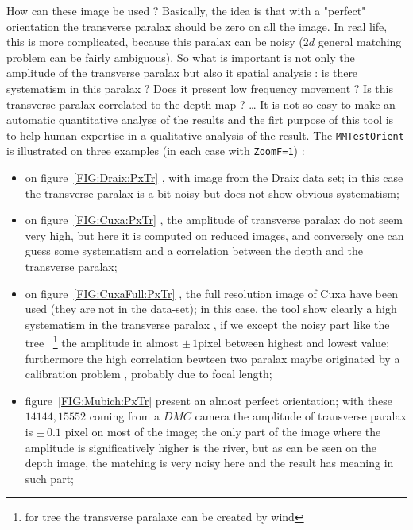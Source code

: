How can these image be used ? Basically, the idea is that with a "perfect" orientation the 
transverse paralax should be zero on all the image. In real life, this is more complicated, because this
paralax can be noisy ($2d$ general matching problem can be fairly ambiguous). So what is important is not
only the amplitude of the transverse paralax but also it spatial analysis : is there systematism in
this paralax ? Does it present low frequency movement ? Is this transverse paralax correlated to the
depth map ? \dots 
It is not so easy to make an automatic quantitative analyse 
of the results and the firt purpose of this tool is to help human expertise in a qualitative analysis of
the result.  The {\tt MMTestOrient} is illustrated on three examples (in each case with {\tt ZoomF=1}) :

\begin{itemize}
   \item on figure~\ref{FIG:Draix:PxTr} , with image from the Draix data set; in this case
          the transverse paralax is a bit noisy but does not show  obvious systematism;

   \item on figure~\ref{FIG:Cuxa:PxTr} , the amplitude of transverse paralax do not seem
         very high, but here it is computed on reduced images, and conversely one can guess
         some systematism and a correlation between the depth and the transverse paralax;

   \item on figure~\ref{FIG:CuxaFull:PxTr} ,  the full resolution image of Cuxa  have been 
         used (they are not in the data-set); in this case, the tool show clearly a high systematism in
         the transverse paralax  , if we except the noisy part like the tree ~\footnote{for tree the
         transverse paralaxe can be created by wind} the amplitude in almost $\pm\,1$pixel
         between highest and lowest value; furthermore the high correlation bewteen two paralax
         maybe originated by a calibration problem , probably due to focal length;

   \item figure~\ref{FIG:Mubich:PxTr} present an almost perfect orientation; with these $14144,15552$
         coming from a $DMC$ camera the amplitude of transverse paralax is $\pm\, 0.1$ pixel on most
         of the image; the only part of the image where the amplitude is significatively higher is
         the river, but as can be seen on the depth image, the matching is very noisy here and the 
         result has meaning in such part;

\end{itemize}

